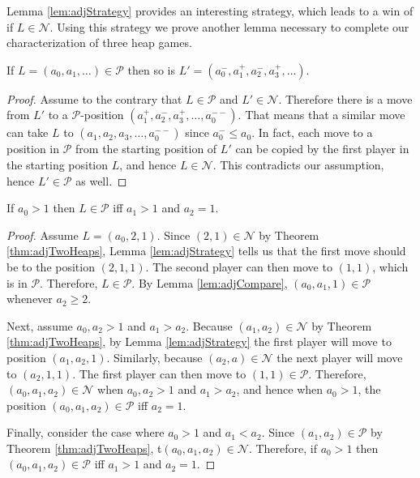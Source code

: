 \documentclass[letter,10pt]{article}
\begin{document}
Lemma \ref{lem:adjStrategy} provides an interesting strategy, which leads to a win of if $L\in \mathcal{N}$. Using this strategy we prove another lemma necessary to complete our characterization of three heap games. 

\begin{lemma}\label{lem:adjCompare}
If $L=(a_0,a_1,\ldots)\in \mathcal{P}$ then so is $L'=(a_0^-,a_1^+,a_2^-,a_3^+,\ldots)$.
\end{lemma}
\begin{proof}
Assume to the contrary that $L\in \mathcal{P}$ and $L'\in \mathcal{N}$. Therefore there is a move from $L'$ to a $\mathcal{P}$-position $(a_1^+,a_2^-,a_3^+,\ldots ,a_0^{--})$. That means that a similar move can take $L$ to $(a_1,a_2,a_3,\ldots, a_0^{--})$ since $a_0^-\leq a_0$. In fact, each move to a position in $\mathcal{P}$ from the starting position of $L'$ can be copied by the first player in the starting position $L$, and hence $L\in \mathcal{N}$. This contradicts our assumption, hence $L'\in \mathcal{P}$ as well.
\end{proof}

\begin{theorem}\label{thm:adjThreeHeaps2}
If $a_0>1$ then $L\in \mathcal{P}$ iff $a_1>1$ and $a_2=1$.
\end{theorem}
\begin{proof}
Assume $L=(a_0,2,1)$. Since $(2,1)\in \mathcal{N}$ by Theorem \ref{thm:adjTwoHeaps}, Lemma \ref{lem:adjStrategy} tells us that the first move should be to the position $(2,1,1)$. The second player can then move to $(1,1)$, which is in $\mathcal{P}$. Therefore, $L\in \mathcal{P}$. By Lemma \ref{lem:adjCompare}, $(a_0,a_1,1)\in \mathcal{P}$ whenever $a_2\geq 2$.

Next, assume $a_0,a_2>1$ and $a_1>a_2$. Because $(a_1,a_2)\in \mathcal{N}$ by Theorem \ref{thm:adjTwoHeaps}, by Lemma \ref{lem:adjStrategy} the first player will move to position $(a_1,a_2,1)$. Similarly, because $(a_2,a)\in \mathcal{N}$ the next player will move to $(a_2,1,1)$. The first player can then move to $(1,1)\in \mathcal{P}$. Therefore, $(a_0,a_1,a_2)\in \mathcal{N}$ when $a_0,a_2>1$ and $a_1>a_2$, and hence when $a_0>1$, the position $(a_0,a_1,a_2)\in \mathcal{P}$ iff $a_2=1$. 

Finally, consider the case where $a_0>1$ and $a_1<a_2$. Since $(a_1,a_2)\in \mathcal{P}$ by Theorem \ref{thm:adjTwoHeaps}, t$(a_0,a_1,a_2)\in \mathcal{N}$. Therefore, if $a_0>1$ then $(a_0,a_1,a_2)\in \mathcal{P}$ iff $a_1>1$ and $a_2=1$.
\end{proof}
\end{document}
